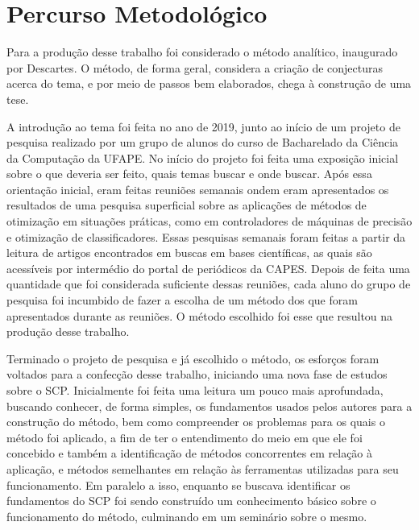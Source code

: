 \chapter{Percurso Metodológico}
\label{chap:metodologia}

\noindent
Para a produção desse trabalho foi considerado o método analítico, inaugurado por Descartes. O método, de forma geral, considera a criação de conjecturas acerca do tema, e por meio de passos bem elaborados, chega à construção de uma tese.

A introdução ao tema foi feita no ano de 2019, junto ao início de um projeto de pesquisa realizado por um grupo de alunos do curso de Bacharelado da Ciência da Computação da UFAPE. No início do projeto foi feita uma exposição inicial sobre o que deveria ser feito, quais temas buscar e onde buscar. Após essa orientação inicial, eram feitas reuniões semanais ondem eram apresentados os resultados de uma pesquisa superficial sobre as aplicações de métodos de otimização em situações práticas, como em controladores de máquinas de precisão e otimização de classificadores. Essas pesquisas semanais foram feitas a partir da leitura de artigos encontrados em buscas em bases científicas, as quais são acessíveis por intermédio do portal de periódicos da CAPES. Depois de feita uma quantidade que foi considerada suficiente dessas reuniões, cada aluno do grupo de pesquisa foi incumbido de fazer a escolha de um método dos que foram apresentados durante as reuniões. O método escolhido foi esse que resultou na produção desse trabalho.

Terminado o projeto de pesquisa e já escolhido o método, os esforços foram voltados para a confecção desse trabalho, iniciando uma nova fase de estudos sobre o SCP. Inicialmente foi feita uma leitura um pouco mais aprofundada, buscando conhecer, de forma simples, os fundamentos usados pelos autores para a construção do método, bem como compreender os problemas para os quais o método foi aplicado, a fim de ter o entendimento do meio em que ele foi concebido e também a identificação de métodos concorrentes em relação à aplicação, e métodos semelhantes em relação às ferramentas utilizadas para seu funcionamento. Em paralelo a isso, enquanto se buscava identificar os fundamentos do SCP foi sendo construído um conhecimento básico sobre o funcionamento do método, culminando em um seminário sobre o mesmo.


